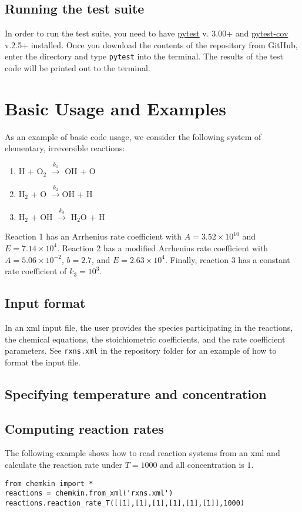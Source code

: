 \documentclass[12pt]{article}
\begin{document}
\subsection{Running the test suite}
In order to run the test suite, you need to have \href{https://docs.pytest.org/en/latest/}{pytest} v. 3.00+ and \href{https://pypi.python.org/pypi/pytest-cov}{pytest-cov} v.2.5+ installed. Once you download the contents of the repository from GitHub, enter the directory and type {\tt pytest} into the terminal. The results of the test code will be printed out to the terminal. 
  
\section{Basic Usage and Examples}
As an example of basic code usage, we consider the following system of elementary, irreversible reactions:

\begin{enumerate}
\item H + O$_2$ $\overset{k_1}{\rightarrow}$ OH + O 
\item H$_2$ + O $\overset{k_2}{\rightarrow}$OH + H  
\item H$_2$ + OH $\overset{k_3}{\rightarrow}$ H$_2$O + H 
\end{enumerate}

Reaction 1 has an Arrhenius rate coefficient with $A = 3.52\times 10^{10}$ and $E = 7.14\times 10^4$. Reaction 2 has a modified Arrhenius rate coefficient with $A = 5.06\times 10^{-2}$, $b = 2.7$, and $E = 2.63\times10^4$. Finally, reaction 3 has a constant rate coefficient of $k_3 = 10^3$. 



\subsection{Input format}
In an xml input file, the user provides the species participating in the reactions, the chemical equations, the stoichiometric coefficients, and the rate coefficient parameters. See {\tt rxns.xml} in the repository folder for an example of how to format the input file. 

\subsection{Specifying temperature and concentration}

\subsection{Computing reaction rates}

The following example shows how to read reaction systems from an xml and calculate the reaction rate under $T = 1000$ and all concentration is $1$.

\begin{lstlisting}
from chemkin import *
reactions = chemkin.from_xml('rxns.xml')
reactions.reaction_rate_T([[1],[1],[1],[1],[1],[1]],1000)
\end{lstlisting}
\end{document}
